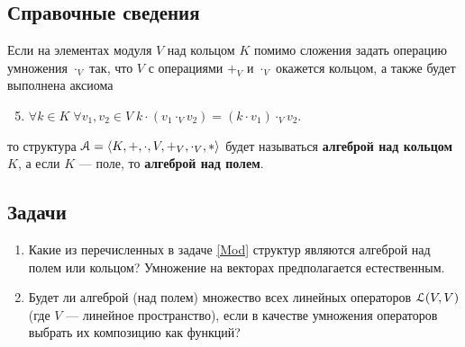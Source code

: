 \subsection*{Справочные сведения}

Если на элементах модуля $V$ над кольцом $K$ помимо сложения задать операцию умножения $\cdot_V$ так, что $V$ с операциями $+_V$ и $\cdot_V$ окажется кольцом, а также будет выполнена аксиома
\begin{enumerate}[Mod1]\setcounter{enumi}{4}
\item $\forall k\in K\;\forall v_1,v_2\in V\; k\cdot (v_1\cdot_V v_2) = (k\cdot v_1)\cdot_V v_2$.
\end{enumerate}
то структура $\mathcal A = \langle K,+,\cdot,V,+_V,\cdot_V,*\rangle$ будет называться \textbf{алгеброй над кольцом} $K$, а если $K$ --- поле, то \textbf{алгеброй над полем}.




\subsection*{Задачи}

\begin{enumerate}
\item Какие из перечисленных в задаче \ref{Mod} структур являются алгеброй над полем или кольцом? Умножение на векторах предполагается естественным.

\item Будет ли алгеброй (над полем) множество всех линейных операторов $\mathcal L(V,V)$ (где $V$ --- линейное пространство), если в качестве умножения операторов выбрать их композицию как функций?



\end{enumerate}
















